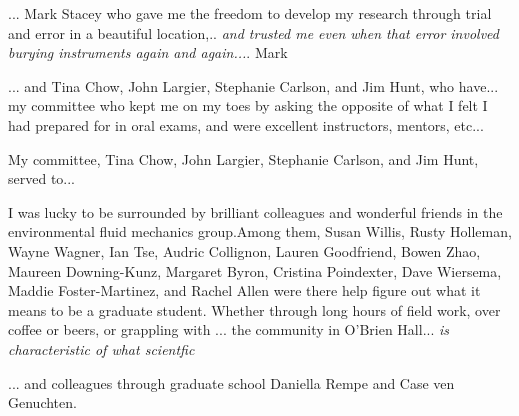 \documentclass{ucbthesis}
\begin{document}
\begin{frontmatter}


\tableofcontents
\clearpage
\listoffigures
\listoftables

\begin{acknowledgements}

... Mark Stacey who gave me the freedom to develop my research through trial and error in a beautiful location,.. 
\emph{and trusted me even when that error involved burying instruments again and again...}. Mark 


... and Tina Chow, John Largier, Stephanie Carlson, and Jim Hunt, who have... 
my committee who kept me on my toes by asking the opposite of what I felt I had prepared for in oral exams, and were excellent instructors, mentors, etc... 

My committee, Tina Chow, John Largier, Stephanie Carlson, and Jim Hunt, served to... 

I was lucky to be surrounded by brilliant colleagues and wonderful friends in the environmental fluid mechanics group.Among them, Susan Willis, Rusty Holleman, Wayne Wagner, Ian Tse, Audric Collignon, Lauren Goodfriend, Bowen Zhao, Maureen Downing-Kunz, Margaret Byron, Cristina Poindexter, Dave Wiersema, Maddie Foster-Martinez, and Rachel Allen were there help figure out what it means to be a graduate student.  Whether through long hours of field work, over coffee or beers, or grappling with ... the community in O'Brien Hall... \emph{is characteristic of what scientfic }


... and colleagues through graduate school Daniella Rempe and Case ven Genuchten. 


\end{acknowledgements}
\end{frontmatter}
\end{document}

